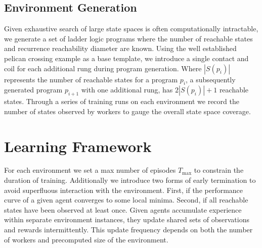 \documentclass[runningheads]{llncs}
\begin{document}
\subsection{Environment Generation}
Given exhaustive search of large state spaces is often computationally intractable, we generate a set of ladder logic programs where the number of reachable states and recurrence reachability diameter are known. Using the well established pelican crossing example as a base template, we introduce a single contact and coil for each additional rung during program generation. Where $|S(p_i)|$ represents the number of reachable states for a program $p_i$, a subsequently generated program $p_{i+1}$ with one additional rung, has $2|S(p_i)|+1$ reachable states. Through a series of training runs on each environment we record the number of states observed by workers to gauge the overall state space coverage. 

\section{Learning Framework}
For each environment we set a max number of episodes $T_{\max}$ to constrain the duration of training. Additionally we introduce two forms of early termination to avoid superfluous interaction with the environment. First, if the performance curve of a given agent converges to some local minima. Second, if all reachable states have been observed at least once. Given agents accumulate experience within separate environment instances, they update shared sets of observations and rewards intermittently. This update frequency depends on both the number of workers and precomputed size of the environment.
\end{document}
